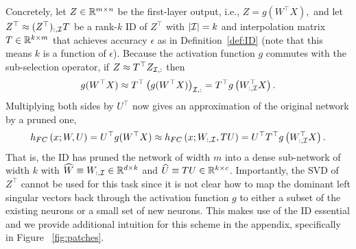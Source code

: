 Concretely, let $Z \in \mathbb{R}^{m \times n}$ be the first-layer output, i.e., $Z = g(W^\top X),$ and let $Z^\top \approx (Z^\top)_{:,\mathcal{I}}  T $
be a rank-$k$ ID of $Z^\top$
with $|\mathcal{I}| = k$ and interpolation matrix $T \in \mathbb{R}^{k \times m}$ that achieves accuracy $\epsilon$ as in Definition~\ref{def:ID} (note that this means $k$ is a function of $\epsilon$).
Because the activation function $g$ commutes with the sub-selection operator, if $Z \approx T^\top Z_{\mathcal{I},:}$ then
\begin{align*}
    g(W^\top X) 
    \approx T^\top \left( g(W^\top X) \right)_{\mathcal{I},:}
    =
    T^\top g\left( W_{:,\mathcal{I}}^\top X \right).
\end{align*}
Multiplying both sides by $U^\top$ now gives an approximation of the original network by a pruned one,
\begin{equation}
    h_{FC}\left(x; W, U \right) 
    =
    U^\top g(W^\top X) \approx \\
    h_{FC}\left(x; W_{:,\mathcal{I}}, T U \right)
    =
    U^\top T^\top g\left( W_{:,\mathcal{I}}^\top X \right).
    \label{eqn:PruneApprox}
\end{equation}
That is, the ID has pruned the network of width $m$ into a dense sub-network of width $k$ with $\widehat W \equiv W_{:,\mathcal{I}} \in \mathbb{R}^{d \times k}$ and $\widehat U \equiv T U \in \mathbb{R}^{k \times c}$.
Importantly, 
the SVD of $Z^\top$ cannot be used for this task since
it is not clear how to map the dominant left singular vectors back through the activation function $g$ to either a subset of the existing neurons or a small set of new neurons.
This makes use of the ID essential and we provide additional intuition for this scheme in the appendix, specifically in Figure ~\ref{fig:patches}.  




